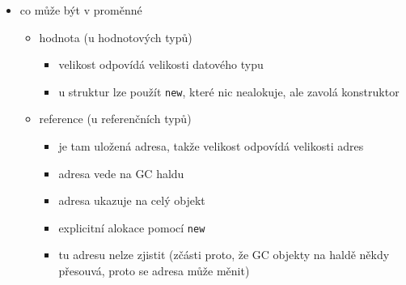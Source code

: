 \begin{itemize}
\begin{itemize}
\begin{itemize}
\begin{itemize}
\item lock
\begin{itemize}
\item owner thread + counter (kvůli rekurzivnímu zamykání)
\item waiting threads list - nějaký férový seznam (nebo fronta, na tom nesejde)
\end{itemize}
\item condition variable
\begin{itemize}
\item sleeping threads list
\end{itemize}
\end{itemize}
\item pointer na typ (zjednodušeně řečeno)
\begin{itemize}
\item třída System.Type, má instance na GC haldě
\item každý datový typ odpovídá jedné instanci třídy
\end{itemize}
\item na referenčních proměnných jde volat \texttt{.\allowbreak{}GetType(\allowbreak{})\allowbreak{}}
\end{itemize}
\item co může být v proměnné
\begin{itemize}
\item hodnota (u hodnotových typů)
\begin{itemize}
\item velikost odpovídá velikosti datového typu
\item u struktur lze použít \texttt{new}, které nic nealokuje, ale zavolá konstruktor
\end{itemize}
\item reference (u referenčních typů)
\begin{itemize}
\item je tam uložená adresa, takže velikost odpovídá velikosti adres
\item adresa vede na GC haldu
\item adresa ukazuje na celý objekt
\item explicitní alokace pomocí \texttt{new}
\item tu adresu nelze zjistit (zčásti proto, že GC objekty na haldě někdy přesouvá, proto se adresa může měnit)
\end{itemize}
\end{itemize}
\end{itemize}

\end{itemize}
